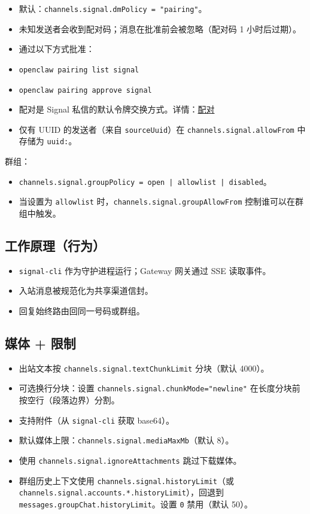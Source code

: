 \begin{itemize}
  \item 默认：\texttt{channels.signal.dmPolicy = "pairing"}。
  \item 未知发送者会收到配对码；消息在批准前会被忽略（配对码 1 小时后过期）。
  \item 通过以下方式批准：
  \item \texttt{openclaw pairing list signal}
  \item \texttt{openclaw pairing approve signal }
  \item 配对是 Signal 私信的默认令牌交换方式。详情：\href{/channels/pairing}{配对}
  \item 仅有 UUID 的发送者（来自 \texttt{sourceUuid}）在 \texttt{channels.signal.allowFrom} 中存储为 \texttt{uuid:}。
\end{itemize}


群组：

\begin{itemize}
  \item \texttt{channels.signal.groupPolicy = open | allowlist | disabled}。
  \item 当设置为 \texttt{allowlist} 时，\texttt{channels.signal.groupAllowFrom} 控制谁可以在群组中触发。
\end{itemize}


\subsection{工作原理（行为）}


\begin{itemize}
  \item \texttt{signal-cli} 作为守护进程运行；Gateway 网关通过 SSE 读取事件。
  \item 入站消息被规范化为共享渠道信封。
  \item 回复始终路由回同一号码或群组。
\end{itemize}


\subsection{媒体 + 限制}


\begin{itemize}
  \item 出站文本按 \texttt{channels.signal.textChunkLimit} 分块（默认 4000）。
  \item 可选换行分块：设置 \texttt{channels.signal.chunkMode="newline"} 在长度分块前按空行（段落边界）分割。
  \item 支持附件（从 \texttt{signal-cli} 获取 base64）。
  \item 默认媒体上限：\texttt{channels.signal.mediaMaxMb}（默认 8）。
  \item 使用 \texttt{channels.signal.ignoreAttachments} 跳过下载媒体。
  \item 群组历史上下文使用 \texttt{channels.signal.historyLimit}（或 \texttt{channels.signal.accounts.*.historyLimit}），回退到 \texttt{messages.groupChat.historyLimit}。设置 \texttt{0} 禁用（默认 50）。
\end{itemize}


